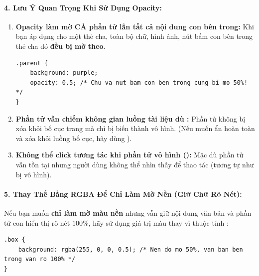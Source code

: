 \paragraph{4. Lưu Ý Quan Trọng Khi Sử Dụng Opacity:}

\begin{warnBox}
\begin{enumerate}[leftmargin=1.5em, itemsep=4pt, parsep=0pt]
    \item \textbf{Opacity làm mờ CẢ phần tử lẫn tất cả nội dung con bên trong:} Khi bạn áp dụng  cho một thẻ cha, toàn bộ chữ, hình ảnh, nút bấm con bên trong thẻ cha đó \textbf{đều bị mờ theo}.
\begin{codeWindow}
\begin{lstlisting}[language=CSS3]
.parent {
    background: purple;
    opacity: 0.5; /* Chu va nut bam con ben trong cung bi mo 50%! */
}
\end{lstlisting}
\end{codeWindow}

    \item \textbf{Phần tử vẫn chiếm không gian luồng tài liệu dù :} Phần tử không bị xóa khỏi bố cục trang mà chỉ bị biến thành vô hình. (Nếu muốn ẩn hoàn toàn và xóa khỏi luồng bố cục, hãy dùng ).

    \item \textbf{Không thể click tương tác khi phần tử vô hình ():} Mặc dù phần tử vẫn tồn tại nhưng người dùng không thể nhìn thấy để thao tác (tương tự như bị vô hình).
\end{enumerate}
\end{warnBox}

\paragraph{5. Thay Thế Bằng RGBA Để Chỉ Làm Mờ Nền (Giữ Chữ Rõ Nét):}

Nếu bạn muốn \textbf{chỉ làm mờ màu nền} nhưng vẫn giữ nội dung văn bản và phần tử con hiển thị rõ nét $100\%$, hãy sử dụng giá trị màu  thay vì thuộc tính :

\begin{codeWindow}
\begin{lstlisting}[language=CSS3]
.box {
    background: rgba(255, 0, 0, 0.5); /* Nen do mo 50%, van ban ben trong van ro 100% */
}
\end{lstlisting}
\end{codeWindow}

